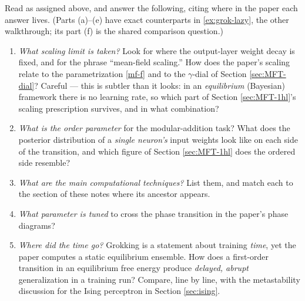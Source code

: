 \documentclass[11pt]{article}
\begin{document}
\begin{exercise}
\label{ex:grok}
Read \cite{rubin2024grokking} as assigned above, and answer the following, citing where in the paper each answer lives. (Parts (a)--(e) have exact counterparts in \cref{ex:grok-lazy}, the other walkthrough; its part (f) is the shared comparison question.)
\begin{enumerate}
    \item \emph{What scaling limit is taken?} Look for where the output-layer weight decay is fixed, and for the phrase ``mean-field scaling.'' How does the paper's scaling relate to the parametrization \eqref{mf-f} and to the $\gamma$-dial of Section \ref{sec:MFT-dial}? Careful --- this is subtler than it looks: in an \emph{equilibrium} (Bayesian) framework there is no learning rate, so which part of Section \ref{sec:MFT-1hl}'s scaling prescription survives, and in what combination?
    \item \emph{What is the order parameter} for the modular-addition task? What does the posterior distribution of a \emph{single neuron's} input weights look like on each side of the transition, and which figure of Section \ref{sec:MFT-1hl} does the ordered side resemble?
    \item \emph{What are the main computational techniques?} List them, and match each to the section of these notes where its ancestor appears.
    \item \emph{What parameter is tuned} to cross the phase transition in the paper's phase diagrams?
    \item \emph{Where did the time go?} Grokking is a statement about training \emph{time}, yet the paper computes a static equilibrium ensemble. How does a first-order transition in an equilibrium free energy produce \emph{delayed, abrupt} generalization in a training run? Compare, line by line, with the metastability discussion for the Ising perceptron in Section \ref{sec:ising}.
\end{enumerate}
\end{exercise}


\end{document}
